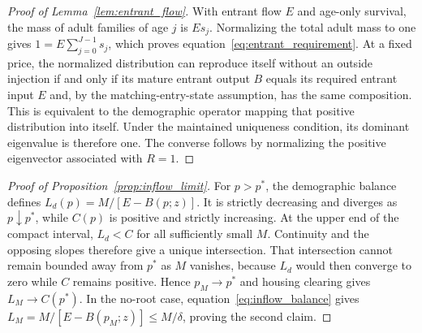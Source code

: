 \documentclass[11pt]{article}
\theoremstyle{definition}
\begin{document}
\begin{proof}[Proof of Lemma~\ref{lem:entrant_flow}]
With entrant flow $E$ and age-only survival, the mass of adult families of age
$j$ is $E s_j$. Normalizing the total adult mass to one gives
$1=E\sum_{j=0}^{J-1}s_j$, which proves
equation~\eqref{eq:entrant_requirement}. At a fixed price, the normalized
distribution can reproduce itself without an outside injection if and only if
its mature entrant output $B$ equals its required entrant input $E$ and, by the
matching-entry-state assumption, has the same composition. This is equivalent
to the demographic operator mapping that positive distribution into itself.
Under the maintained uniqueness condition, its dominant eigenvalue is therefore
one. The converse follows by normalizing the positive eigenvector associated
with $R=1$.
\end{proof}

\begin{proof}[Proof of Proposition~\ref{prop:inflow_limit}]
For $p>p^*$, the demographic balance defines
$L_d(p)=M/[E-B(p;z)]$. It is strictly decreasing and diverges as
$p\downarrow p^*$, while $C(p)$ is positive and strictly increasing. At the
upper end of the compact interval, $L_d<C$ for all sufficiently small $M$.
Continuity and the opposing slopes therefore give a unique intersection.
That intersection cannot remain bounded away from $p^*$ as $M$ vanishes,
because $L_d$ would then converge to zero while $C$ remains positive. Hence
$p_M\to p^*$ and housing clearing gives $L_M\to C(p^*)$. In the no-root case,
equation~\eqref{eq:inflow_balance} gives
$L_M=M/[E-B(p_M;z)]\leq M/\delta$, proving the second claim.
\end{proof}



\end{document}
